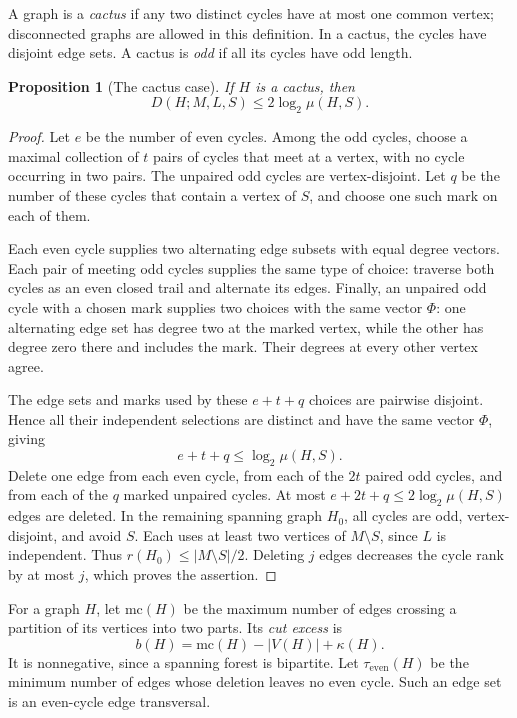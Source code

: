 \documentclass[11pt]{article}
\numberwithin{equation}{section}
\newtheorem{proposition}[theorem]{Proposition}
\theoremstyle{remark}
\begin{document}
A graph is a \emph{cactus} if any two distinct cycles have at most one common vertex; disconnected graphs are allowed in this definition. In a cactus, the cycles have disjoint edge sets. A cactus is \emph{odd} if all its cycles have odd length.

\begin{proposition}[The cactus case]\label{prop:cactus}
If $H$ is a cactus, then
\[
D(H;M,L,S)\le2\log_2\mu(H,S).
\]
\end{proposition}

\begin{proof}
Let $e$ be the number of even cycles. Among the odd cycles, choose a maximal collection of $t$ pairs of cycles that meet at a vertex, with no cycle occurring in two pairs. The unpaired odd cycles are vertex-disjoint. Let $q$ be the number of these cycles that contain a vertex of $S$, and choose one such mark on each of them.

Each even cycle supplies two alternating edge subsets with equal degree vectors. Each pair of meeting odd cycles supplies the same type of choice: traverse both cycles as an even closed trail and alternate its edges. Finally, an unpaired odd cycle with a chosen mark supplies two choices with the same vector $\Phi$: one alternating edge set has degree two at the marked vertex, while the other has degree zero there and includes the mark. Their degrees at every other vertex agree.

The edge sets and marks used by these $e+t+q$ choices are pairwise disjoint. Hence all their independent selections are distinct and have the same vector $\Phi$, giving
\begin{equation}\label{eq:etq}
e+t+q\le\log_2\mu(H,S).
\end{equation}
Delete one edge from each even cycle, from each of the $2t$ paired odd cycles, and from each of the $q$ marked unpaired cycles. At most $e+2t+q\le2\log_2\mu(H,S)$ edges are deleted. In the remaining spanning graph $H_0$, all cycles are odd, vertex-disjoint, and avoid $S$. Each uses at least two vertices of $M\setminus S$, since $L$ is independent. Thus $r(H_0)\le|M\setminus S|/2$. Deleting $j$ edges decreases the cycle rank by at most $j$, which proves the assertion.
\end{proof}

For a graph $H$, let $\mathrm{mc}(H)$ be the maximum number of edges crossing a partition of its vertices into two parts. Its \emph{cut excess} is
\[
b(H)=\mathrm{mc}(H)-|V(H)|+\kappa(H).
\]
It is nonnegative, since a spanning forest is bipartite. Let $\tau_{\mathrm{even}}(H)$ be the minimum number of edges whose deletion leaves no even cycle. Such an edge set is an even-cycle edge transversal.
\end{document}
